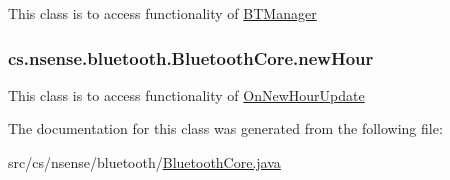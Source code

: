This class is to access functionality of \hyperlink{classcs_1_1nsense_1_1bluetooth_1_1_b_t_manager}{B\-T\-Manager} \hypertarget{classcs_1_1nsense_1_1bluetooth_1_1_bluetooth_core_af4da0ccb246aa6a4b0615adc9cd0eef9}{
\subsubsection[{new\-Hour}]{ cs.\-nsense.\-bluetooth.\-Bluetooth\-Core.\-new\-Hour\hspace{0.3cm}{\ttfamily [private]}}}\label{classcs_1_1nsense_1_1bluetooth_1_1_bluetooth_core_af4da0ccb246aa6a4b0615adc9cd0eef9}
This class is to access functionality of \hyperlink{classcs_1_1nsense_1_1bluetooth_1_1_on_new_hour_update}{On\-New\-Hour\-Update} 

The documentation for this class was generated from the following file\-:\begin{DoxyCompactItemize}
\item 
src/cs/nsense/bluetooth/\hyperlink{_bluetooth_core_8java}{Bluetooth\-Core.\-java}\end{DoxyCompactItemize}
